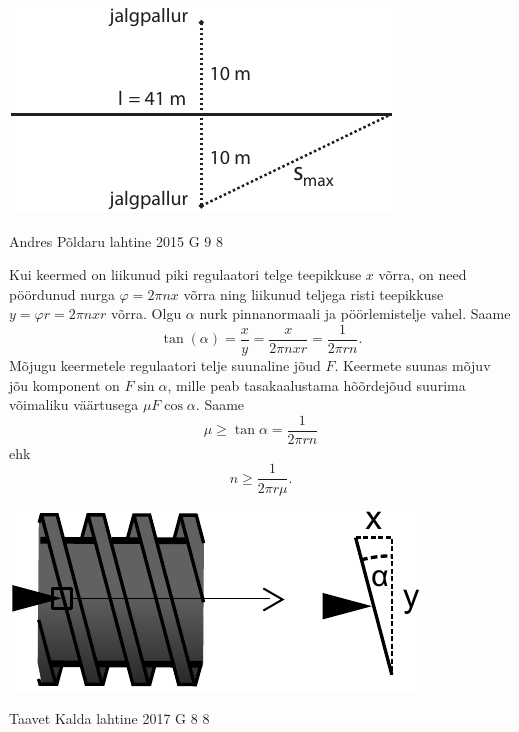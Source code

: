 \documentclass[11pt, twoside]{article}
\begin{document}
{{\begin{center}
\includegraphics{2013-v3g-09-jalgpallurid}
\end{center}
\fi
}

{Andres Põldaru} %
{lahtine} %
{2015} %
{G 9} %
{8} %
{

\ifSolution
Kui keermed on liikunud piki regulaatori telge teepikkuse $x$ võrra, on need pöördunud nurga $\varphi=2\pi nx$ võrra ning liikunud teljega risti teepikkuse $y=\varphi r=2\pi nxr$ võrra. Olgu $\alpha$ nurk pinnanormaali ja pöörlemistelje vahel. Saame 
\[
\tan(\alpha)=\frac{x}{y}=\frac{x}{2\pi nxr}=\frac{1}{2\pi rn}.
\]
Mõjugu keermetele regulaatori telje suunaline jõud $F$. Keermete suunas mõjuv jõu komponent on $F\sin\alpha$, mille peab tasakaalustama hõõrdejõud suurima võimaliku väärtusega $\mu F\cos\alpha$. Saame 
\[
\mu\geq\tan\alpha=\frac{1}{2\pi rn}
\]
ehk
\[
n\ge\frac{1}{2\pi r\mu}.
\]

\begin{center}
\includegraphics[width=0.5\linewidth]{2015-lahg-09-mutriv6ti_lahendus.pdf}
\end{center}
\fi
}

{Taavet Kalda} %
{lahtine} %
{2017} %
{G 8} %
{8} %
{

}}
\end{document}
